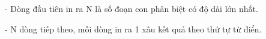 - Dòng đầu tiên in ra N là số đoạn con phân biệt có độ dài lớn nhất.  

   - N dòng tiếp theo, mỗi dòng in ra 1 xâu kết quả theo thứ tự từ điển.  

\